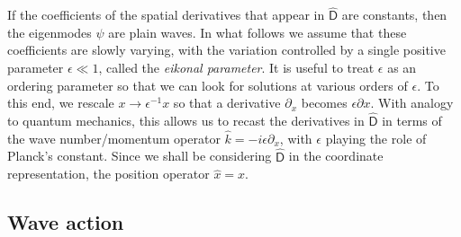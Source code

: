 If the coefficients of the spatial derivatives that appear in $\widehat{\mathsf{D}}$ are constants, then the eigenmodes $\psi$ are plain waves.
In what follows we assume that these coefficients are slowly varying, with the variation controlled by a single positive parameter $\epsilon \ll 1$, called the \emph{eikonal parameter}.
It is useful to treat $\epsilon$ as an ordering parameter so that we can look for solutions at various orders of $\epsilon$.
To this end, we rescale $x \to \epsilon^{-1}x$ so that a derivative $\partial_{x}$ becomes $\epsilon \partial x$.
With analogy to quantum mechanics, this allows us to recast the derivatives in $\widehat{\mathsf{D}}$ in terms of the wave number/momentum operator $\hat{k} = -i\epsilon \partial_{x}$, with $\epsilon$ playing the role of Planck's constant.
Since we shall be considering $\widehat{\mathsf{D}}$ in the coordinate representation, the position operator $\hat{x} = x$.

\subsection{Wave action}

